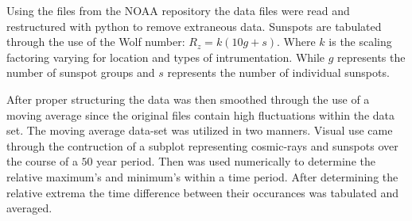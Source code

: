 \par Using the files from the NOAA repository the data files were read and 
restructured with python to remove extraneous data.
Sunspots are tabulated through the use of the Wolf number: $R_z=k(10g+s)$.
Where $k$ is the scaling factoring varying for location and types of intrumentation.
While $g$ represents the number of sunspot groups and $s$ represents the number
of individual sunspots.\\

\par After proper structuring
the data was then smoothed through the use of a moving average since the 
original files contain high fluctuations within the data set.
The moving average data-set was utilized in two manners. 
Visual use came through the contruction of a subplot representing
cosmic-rays and sunspots over the course of a $50$ year period. Then was used
numerically to determine the relative maximum's and minimum's within a time
period. After determining the relative extrema the time difference between
their occurances was tabulated and averaged. 
